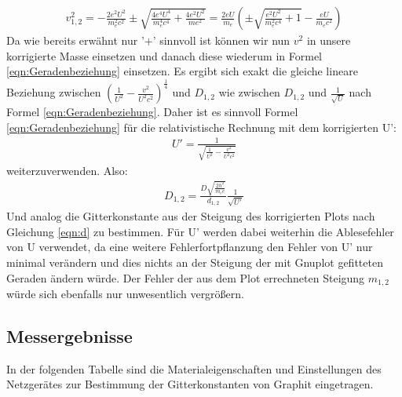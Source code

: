 \documentclass[12pt,a4paper]{article}
\begin{document}
\begin{align}
v^2_{1,2} = -\frac{2e^2U^2}{m_e^2c^2} \pm \sqrt{\frac{4e^4U^4}{m_e^4c^4}+\frac{4e^2U^2}{me^2}} = \frac{2eU}{m_e}\left(\pm\sqrt{\frac{e^2U^2}{m_e^2c^4}+1}-\frac{eU}{m_e c^2}\right)
\end{align}
Da wie bereits erwähnt nur '+' sinnvoll ist können wir nun $v^2$ in unsere korrigierte Masse einsetzen und danach diese wiederum in Formel \ref{eqn:Geradenbeziehung} einsetzen.
Es ergibt sich exakt die gleiche lineare Beziehung zwischen $\left(\frac{1}{U^2}-\frac{v^2}{U^2c^2}\right)^{\frac{1}{4}}$ und $D_{1,2}$ wie zwischen $D_{1,2}$ und $\frac{1}{\sqrt{U}}$ nach Formel \ref{eqn:Geradenbeziehung}.
Daher ist es sinnvoll Formel \ref{eqn:Geradenbeziehung} für die relativistische Rechnung mit dem korrigierten U':
\begin{align}
U' = \frac{1}{\sqrt{\frac{1}{U^2}-\frac{v^2}{U^2c^2}}}
\label{eqn:u_r}
\end{align}
weiterzuverwenden. Also:
\begin{align}
D_{1,2} = \frac{D\sqrt{\frac{2h^2}{m_ee}}}{d_{1,2}}\frac{1}{\sqrt{U'}}
\label{eqn:d_r}
\end{align}
Und analog die Gitterkonstante aus der Steigung des korrigierten Plots nach Gleichung \ref{eqn:d} zu bestimmen.
Für U' werden dabei weiterhin die Ablesefehler von U verwendet, da eine weitere Fehlerfortpflanzung den Fehler von U' nur minimal verändern und dies nichts an der Steigung der mit Gnuplot gefitteten Geraden ändern würde. Der Fehler der aus dem Plot errechneten Steigung $m_{1,2}$ würde sich ebenfalls nur unwesentlich vergrößern.
\subsection{Messergebnisse}

In der folgenden Tabelle sind die Materialeigenschaften und Einstellungen des Netzgerätes zur Bestimmung der Gitterkonstanten von Graphit eingetragen.
\end{document}
